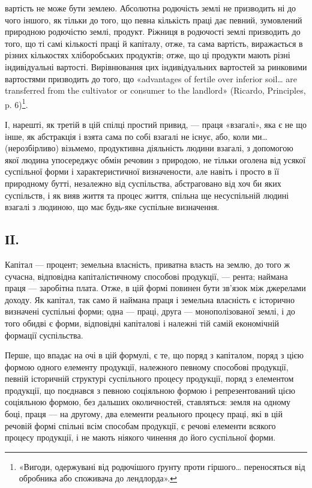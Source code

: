 \parcont{}  %
вартість не може бути землею. Абсолютна родючість землі не призводить ні до
чого іншого, як тільки до того, що певна кількість праці дає певний, зумовлений
природною родючістю землі, продукт. Ріжниця в родючості землі призводить
до того, що ті самі кількості праці й капіталу, отже, та сама вартість, виражається
в різних кількостях хліборобських продуктів; отже, що ці продукти
мають різні індивідуальні вартості. Вирівнювання цих індивідуальних вартостей
за ринковими вартостями призводить до того, що «advantages of fertile over inferior
soil\dots{} are transferred from the cultivator or consumer to the landlord» (Ricardo,
Principles, p. 6)\footnote*{
«Вигоди, одержувані від родючішого ґрунту проти гіршого\dots{} переносяться від обробника або
споживача до лендлорда».
}.

І, нарешті, як третій в цій спілці простий привид, — праця «взагалі»,
яка є не що інше, як абстракція і взята сама по собі взагалі не існує, або,
коли ми\dots{} (нерозбірливо) візьмемо, продуктивна діяльність людини взагалі,
з допомогою якої людина упосереджує обмін речовин з природою, не тільки
оголена від усякої суспільної форми і характеристичної визначености, але навіть
і просто в її природному бутті, незалежно від суспільства, абстраговано від
хоч би яких суспільств, і як вияв життя та процес життя, спільна ще несуспільній
людині взагалі з людиною, що має будь-яке суспільне визначення.

\subsection*{ІI.}

Капітал — процент; земельна власність, приватна власть на землю, до того ж
сучасна, відповідна капіталістичному способові продукції, — рента; наймана праця
— заробітна плата. Отже, в цій формі повинен бути зв’язок між джерелами
доходу. Як капітал, так само й наймана праця і земельна власність є історично
визначені суспільні форми; одна — праці, друга — монополізованої землі, і до
того обидві є форми, відповідні капіталові і належні тій самій економічній
формації суспільства.

Перше, що впадає на очі в цій формулі, є те, що поряд з капіталом,
поряд з цією формою одного елементу продукції, належного певному способові
продукції, певній історичній структурі суспільного процесу продукції, поряд
з елементом продукції, що поєднався з певною соціяльною формою і репрезентований
цією соціяльною формою, без дальших околичностей, ставляться: земля
на одному боці, праця — на другому, два елементи реального процесу праці,
які в цій речовій формі спільні всім способам продукції, є речові елементи
всякого процесу продукції, і не мають ніякого чинення до його суспільної форми.

